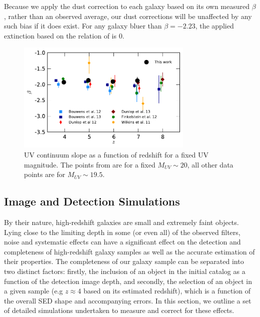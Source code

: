 Because we apply the dust correction to each galaxy based on its own measured $\beta$, rather than an observed average, our dust corrections will be unaffected by any such bias if it does exist. For any galaxy bluer than $\beta = -2.23$, the applied extinction based on the relation of \citet{Meurer:1999jm} is 0.

\begin{figure}
\centering
\includegraphics[width=0.75\textwidth]{plots/figB3.pdf}
\caption[UV continuum slope as a function of redshift for a fixed UV magnitude.]{UV continuum slope as a function of redshift for a fixed UV magnitude. The points from \citep{2012ApJ...756..164F} are for a fixed $M_{UV} \sim 20$, all other data points are for $M_{UV} \sim 19.5$.}
\label{fig:beta_z}
\end{figure}

\subsection{Image and Detection Simulations}\label{sec:simulations}
By their nature, high-redshift galaxies are small and extremely faint objects. Lying close to the limiting depth in some (or even all) of the observed filters, noise and systematic effects can have a significant effect on the detection and completeness of high-redshift galaxy samples as well as the accurate estimation of their properties. The completeness of our galaxy sample can be separated into two distinct factors: firstly, the inclusion of an object in the initial catalog as a function of the detection image depth, and secondly, the selection of an object in a given sample (e.g $z\approx4$ based on its estimated redshift), which is a function of the overall SED shape and accompanying errors. In this section, we outline a set of detailed simulations undertaken to measure and correct for these effects.

